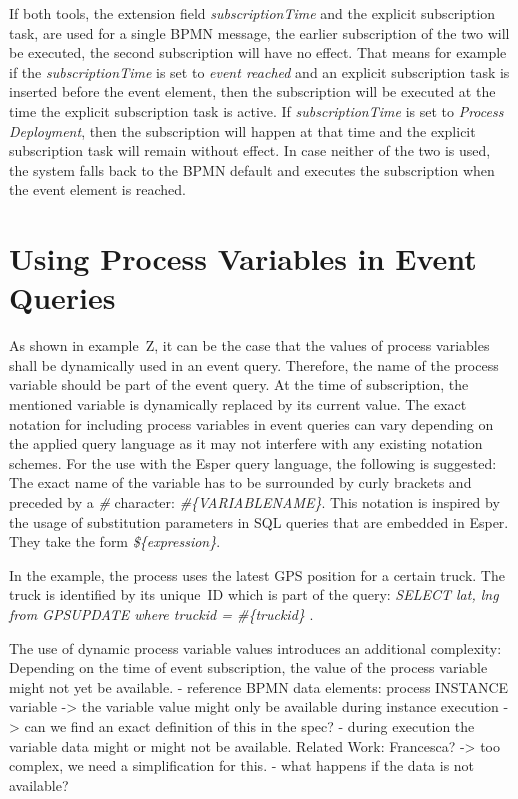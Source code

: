 If both tools, the extension field \textit{subscriptionTime} and the explicit subscription task, are used for a single BPMN message, the earlier subscription of the two will be executed, the second subscription will have no effect.
That means for example if the \textit{subscriptionTime} is set to \textit{event reached} and an explicit subscription task is inserted before the event element, then the subscription will be executed at the time the explicit subscription task is active.
If \textit{subscriptionTime} is set to \textit{Process Deployment}, then the subscription will happen at that time and the explicit subscription task will remain without effect.
In case neither of the two is used, the system falls back to the BPMN default and executes the subscription when the event element is reached.

\section{Using Process Variables in Event Queries}



As shown in example~Z, it can be the case that the values of process variables shall be dynamically used in an event query.
Therefore, the name of the process variable should be part of the event query. At the time of subscription, the mentioned variable is dynamically replaced by its current value.
The exact notation for including process variables in event queries can vary depending on the applied query language as it may not interfere with any existing notation schemes.
For the use with the Esper query language, the following is suggested: The exact name of the variable has to be surrounded by curly brackets and preceded by a \textit{\#} character: \textit{\#\{VARIABLENAME\}}.
This notation is inspired by the usage of substitution parameters in SQL queries that are embedded in Esper. They take the form \textit{\$\{expression\}}.

In the example, the process uses the latest GPS position for a certain truck. The truck is identified by its unique~ID which is part of the query: \textit{SELECT lat, lng from GPSUPDATE where truckid = \#\{truckid\} }.

The use of dynamic process variable values introduces an additional complexity: Depending on the time of event subscription, the value of the process variable might not yet be available.
- reference BPMN data elements: process INSTANCE variable
-> the variable value might only be available during instance execution
-> can we find an exact definition of this in the spec?
- during execution the variable data might or might not be available. Related Work: Francesca?
-> too complex, we need a simplification for this.
- what happens if the data is not available?





